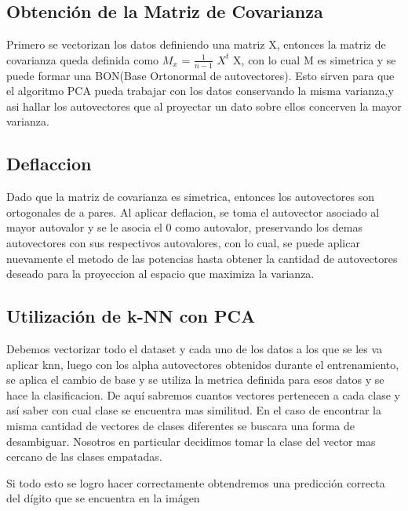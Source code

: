 \subsection{Obtención de la Matriz de Covarianza}
Primero se vectorizan los datos definiendo una matriz X, entonces la matriz de
covarianza queda definida como $M_{x}$ = $\frac{1}{n-1}$ $X^{t}$ X, con lo cual
M es simetrica y se puede formar una BON(Base Ortonormal de autovectores). Esto sirven
para que el algoritmo PCA pueda trabajar con los datos conservando la misma varianza,y asi hallar los autovectores que al proyectar un dato sobre
ellos concerven la mayor varianza.

\subsection{Deflaccion}
Dado que la matriz de covarianza es simetrica, entonces los autovectores son ortogonales de a pares. Al aplicar deflacion, se toma el autovector asociado al mayor autovalor y se le asocia el 0 como autovalor, preservando los demas autovectores con sus respectivos autovalores, con lo cual, se puede aplicar nuevamente el metodo de las potencias hasta obtener la cantidad de autovectores deseado para la proyeccion al espacio que maximiza la varianza.

\subsection{Utilización de k-NN con PCA}

Debemos vectorizar todo el dataset y cada uno de los
datos a los que se les va aplicar knn, luego con los alpha autovectores
obtenidos durante el entrenamiento, se aplica el cambio de base y se utiliza la
metrica definida para esos datos y se hace la clasificacion. De aquí sabremos cuantos vectores pertenecen a cada clase y así saber con cual clase se encuentra mas similitud. En el caso de encontrar la misma cantidad de vectores de clases diferentes se buscara una forma de desambiguar. Nosotros en particular decidimos tomar la clase del vector mas cercano de las clases empatadas.

Si todo esto se logro hacer correctamente obtendremos una predicción correcta
del dígito que se encuentra en la imágen